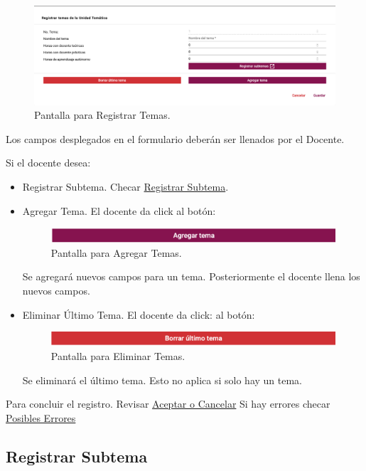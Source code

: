 \hypertarget{RTema}{}
\begin{figure}[H]
    \centering
    \includegraphics[width=0.7\linewidth]{images/SP6/RegistrarTema.png}
    \caption{Pantalla para Registrar Temas.}
\end{figure}

Los campos desplegados en el formulario deberán ser llenados por el Docente.

Si el docente desea:
\begin{itemize}
    \item Registrar Subtema. Checar \hyperlink{RegistrarSubtema}{Registrar Subtema}.
    \item Agregar Tema. El docente da click al botón:
    \begin{figure}[H]
    \centering
    \includegraphics[width=0.4\linewidth]{images/SP6/AgregarTema.png}
    \caption{Pantalla para Agregar Temas.}
    \end{figure}
    Se agregará nuevos campos para un tema. Posteriormente el docente llena los nuevos campos.
    \item Eliminar Último Tema. El docente da click: al botón:
    \begin{figure}[H]
    \centering
    \includegraphics[width=0.4\linewidth]{images/SP6/EliminarTema.png}
    \caption{Pantalla para Eliminar Temas.}
    \end{figure}
    Se eliminará el último tema. Esto no aplica si solo hay un tema.
\end{itemize}

Para concluir el registro. Revisar \hyperlink{AceptarCancelar}{Aceptar o Cancelar}
Si hay errores checar \hyperlink{Errores}{Posibles Errores}

\pagebreak
\hypertarget{RegistrarSubtema}{\subsection{Registrar Subtema}}



